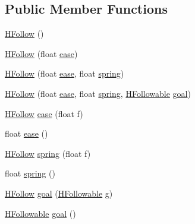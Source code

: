 \subsection*{Public Member Functions}
\begin{DoxyCompactItemize}
\item 
\hyperlink{classhype_1_1behavior_1_1_h_follow_aca7110a86630eef51dd7b0599a3fd888}{H\-Follow} ()
\item 
\hyperlink{classhype_1_1behavior_1_1_h_follow_a005b6d747a0d4ffa8684404743f4e58f}{H\-Follow} (float \hyperlink{classhype_1_1behavior_1_1_h_follow_a6b5ca40e84fc988fe0cdedac8d525e01}{ease})
\item 
\hyperlink{classhype_1_1behavior_1_1_h_follow_ad39ebcb66c1fd855c241d15718bbf78c}{H\-Follow} (float \hyperlink{classhype_1_1behavior_1_1_h_follow_a6b5ca40e84fc988fe0cdedac8d525e01}{ease}, float \hyperlink{classhype_1_1behavior_1_1_h_follow_a79e58c28c4c3c36ed12c34547facfde6}{spring})
\item 
\hyperlink{classhype_1_1behavior_1_1_h_follow_a82bbd3407b987eed3bf195e3d1a95513}{H\-Follow} (float \hyperlink{classhype_1_1behavior_1_1_h_follow_a6b5ca40e84fc988fe0cdedac8d525e01}{ease}, float \hyperlink{classhype_1_1behavior_1_1_h_follow_a79e58c28c4c3c36ed12c34547facfde6}{spring}, \hyperlink{interfacehype_1_1interfaces_1_1_h_followable}{H\-Followable} \hyperlink{classhype_1_1behavior_1_1_h_follow_a100935196d6a2f30c346669e740c6d93}{goal})
\item 
\hyperlink{classhype_1_1behavior_1_1_h_follow}{H\-Follow} \hyperlink{classhype_1_1behavior_1_1_h_follow_a6b5ca40e84fc988fe0cdedac8d525e01}{ease} (float f)
\item 
float \hyperlink{classhype_1_1behavior_1_1_h_follow_ad0afa0281b5c0ce0c1bcb9598f43daac}{ease} ()
\item 
\hyperlink{classhype_1_1behavior_1_1_h_follow}{H\-Follow} \hyperlink{classhype_1_1behavior_1_1_h_follow_a79e58c28c4c3c36ed12c34547facfde6}{spring} (float f)
\item 
float \hyperlink{classhype_1_1behavior_1_1_h_follow_a51a1cb2abc314c1ace9f62207f8c9295}{spring} ()
\item 
\hyperlink{classhype_1_1behavior_1_1_h_follow}{H\-Follow} \hyperlink{classhype_1_1behavior_1_1_h_follow_a100935196d6a2f30c346669e740c6d93}{goal} (\hyperlink{interfacehype_1_1interfaces_1_1_h_followable}{H\-Followable} g)
\item 
\hyperlink{interfacehype_1_1interfaces_1_1_h_followable}{H\-Followable} \hyperlink{classhype_1_1behavior_1_1_h_follow_a0d071b736938dc93d73db4c843e3eaa1}{goal} ()

\end{DoxyCompactItemize}
